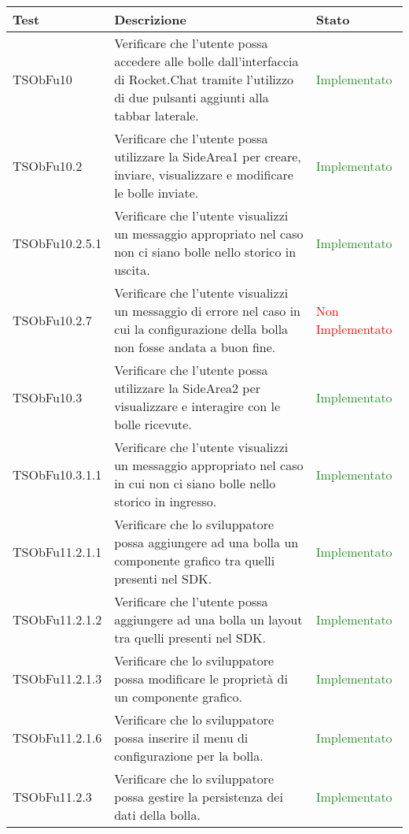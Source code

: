 \begin{center}
\begin{longtable}{|
*{1}{>{\centering\arraybackslash}p{2.8cm}|}
*{1}{>{\centering\arraybackslash}p{6cm}|}
*{1}{>{\centering\arraybackslash}p{3cm}|}}
\hline \textbf{Test} & \textbf{Descrizione} & \textbf{Stato}\\
\hline \endhead

TSObFu10 & Verificare che l'utente possa accedere alle bolle dall'interfaccia di Rocket.Chat tramite l'utilizzo di due pulsanti aggiunti alla tabbar laterale. & \textcolor{ForestGreen}{Implementato}\\
 \hline 
TSObFu10.2 & Verificare che l'utente possa utilizzare la SideArea1 per creare, inviare, visualizzare e modificare le bolle inviate. & \textcolor{ForestGreen}{Implementato}\\
 \hline 
TSObFu10.2.5.1 & Verificare che l'utente visualizzi un messaggio appropriato nel caso non ci siano bolle nello storico in uscita. & \textcolor{ForestGreen}{Implementato}\\
 \hline 
TSObFu10.2.7 & Verificare che l'utente visualizzi un messaggio di errore nel caso in cui la configurazione della bolla non fosse andata a buon fine. & \textcolor{Red}{Non Implementato}\\
 \hline 
TSObFu10.3 & Verificare che l'utente possa utilizzare la SideArea2 per visualizzare e interagire con le bolle ricevute. & \textcolor{ForestGreen}{Implementato}\\
 \hline 
TSObFu10.3.1.1 & Verificare che l'utente visualizzi un messaggio appropriato nel caso in cui non ci siano bolle nello storico in ingresso. & \textcolor{ForestGreen}{Implementato}\\
 \hline 
TSObFu11.2.1.1 & Verificare che lo sviluppatore possa aggiungere ad una bolla un componente grafico tra quelli presenti nel SDK. & \textcolor{ForestGreen}{Implementato}\\
 \hline 
TSObFu11.2.1.2 & Verificare che l'utente possa aggiungere ad una bolla un layout tra quelli presenti nel SDK. & \textcolor{ForestGreen}{Implementato}\\
 \hline 
TSObFu11.2.1.3 & Verificare che lo sviluppatore possa modificare le proprietà di un componente grafico. & \textcolor{ForestGreen}{Implementato}\\
 \hline 
TSObFu11.2.1.6 & Verificare che lo sviluppatore possa inserire il menu di configurazione per la bolla. & \textcolor{ForestGreen}{Implementato}\\
 \hline 
TSObFu11.2.3 & Verificare che lo sviluppatore possa gestire la persistenza dei dati della bolla. & \textcolor{ForestGreen}{Implementato}\\

\end{longtable}
\end{center}

